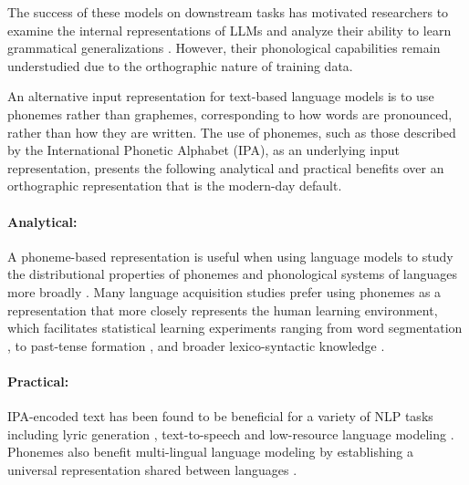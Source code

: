 The success of these models on downstream tasks has motivated researchers to examine the internal representations of LLMs and analyze their ability to learn grammatical generalizations \citep{hewitt-manning-2019-structural, hu-etal-2020-systematic, manning-2020-emergent}. However, their phonological capabilities remain understudied due to the orthographic nature of training data.



An alternative input representation for text-based language models is to use phonemes rather than graphemes, corresponding to how words are pronounced, rather than how they are written. The use of phonemes, such as those described by the International Phonetic Alphabet (IPA), as an underlying input representation, presents the following analytical and practical benefits over an orthographic representation that is the modern-day default.

\paragraph{Analytical:} A phoneme-based representation is useful when using language models to study the distributional properties of phonemes \citep{mayer-2020-phonology-distribution} and phonological systems of languages more broadly \citep{eden-2018-phonological-distance}. Many language acquisition studies prefer using phonemes as a representation that more closely represents the human learning environment, which facilitates statistical learning experiments ranging from word segmentation \citep{Coltekin2017}, to past-tense formation \citep{kirov-2018-recurrent}, and broader lexico-syntactic knowledge \citep{lavechin}.

\paragraph{Practical:} IPA-encoded text has been found to be beneficial for a variety of NLP tasks including lyric generation \citep{ding-2024-songcomposer}, text-to-speech \citep{sundararaman-2021-phonemebert, li-2023-phoneme-level-bert} and low-resource language modeling \citep{leong-whitenack-2022-phone}. Phonemes also benefit multi-lingual language modeling by establishing a universal representation shared between languages \citep{feng-2023-language-universal-phonetic, zhu-etal-2024-taste}. 

